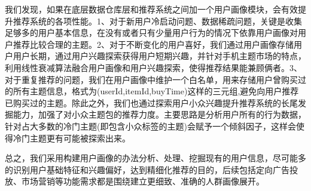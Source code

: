 	我们发现，如果在底层数据仓库层和推荐系统之间加一个用户画像模块，会有效提升推荐系统的各项性能。1、对于新用户冷启动问题、数据稀疏问题，关键是收集足够多的用户基本信息，在没有或者只有少量用户行为的情况下依靠用户画像对用户推荐比较合理的主题。2、对于不断变化的用户喜好，我们通过用户画像存储用户用户长期，通过用户兴趣探索获得用户短期兴趣，并针对手机主题市场的特点，利用线性衰减算法融合用户画像和用户兴趣探索，使得推荐结果能兼顾俩者。3、对于重复推荐的问题，我们在用户画像中维护一个白名单，用来存储用户曾购买过的所有主题信息，格式为(userId,itemId,buyTime)这样的三元组,避免向用户推荐已购买过的主题。除此之外，我们也通过探索用户小众兴趣提升推荐系统的长尾发掘能力，加强了对小众主题包的推荐力度。主要思路是分析用户所有的行为数据，针对占大多数的冷门主题(即包含小众标签的主题)会赋予一个倾斜因子，这样会使得冷门主题更有可能被探索出来。

	总之，我们采用构建用户画像的办法分析、处理、挖掘现有的用户信息，尽可能多的识别用户基础特征和兴趣偏好，达到精细化推荐的目的，后续包括定向广告投放、市场营销等功能需求都是围绕建立更细致、准确的人群画像展开。
